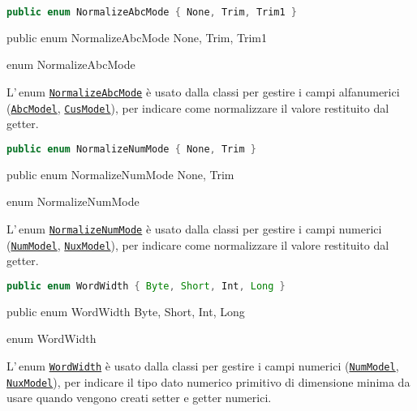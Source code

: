 \ifesource
\begin{lstlisting}[language=java, 
caption=enum NormalizeAbcMode, 
label=lst:NormalizeAbcMode]
public enum NormalizeAbcMode { None, Trim, Trim1 }
\end{lstlisting}
\else
\begin{elisting}
\begin{javacode}
public enum NormalizeAbcMode { None, Trim, Trim1 }
\end{javacode}
\caption{enum NormalizeAbcMode}\label{lst:NormalizeAbcMode}
\end{elisting}
\fi
L'\,enum \hyperref[lst:NormalizeAbcMode]{\texttt{NormalizeAbcMode}} è usato 
dalla classi per gestire i campi alfanumerici 
(\hyperref[lst:AbcModel]{\texttt{AbcModel}},
\hyperref[lst:CusModel]{\texttt{CusModel}}), per indicare come normalizzare
il valore restituito dal getter.

\ifesource
\begin{lstlisting}[language=java, 
caption=enum NormalizeNumMode, 
label=lst:NormalizeNumMode]
public enum NormalizeNumMode { None, Trim }
\end{lstlisting}
\else
\begin{elisting}
\begin{javacode}
public enum NormalizeNumMode { None, Trim }
\end{javacode}
\caption{enum NormalizeNumMode}\label{lst:NormalizeNumMode}
\end{elisting}
\fi
L'\,enum \hyperref[lst:NormalizeNumMode]{\texttt{NormalizeNumMode}} è usato 
dalla classi per gestire i campi numerici 
(\hyperref[lst:NumModel]{\texttt{NumModel}},
\hyperref[lst:NuxModel]{\texttt{NuxModel}}), per indicare come normalizzare
il valore restituito dal getter.

\ifesource
\begin{lstlisting}[language=java, 
caption=enum WordWidth, 
label=lst:WordWidth]
public enum WordWidth { Byte, Short, Int, Long }
\end{lstlisting}
\else
\begin{elisting}
\begin{javacode}
public enum WordWidth { Byte, Short, Int, Long }
\end{javacode}
\caption{enum WordWidth}\label{lst:WordWidth}
\end{elisting}
\fi
L'\,enum \hyperref[lst:WordWidth]{\texttt{WordWidth}} è usato 
dalla classi per gestire i campi numerici 
(\hyperref[lst:NumModel]{\texttt{NumModel}},
\hyperref[lst:NuxModel]{\texttt{NuxModel}}), per indicare il tipo dato numerico
primitivo di dimensione minima da usare quando vengono creati setter e getter
numerici.

